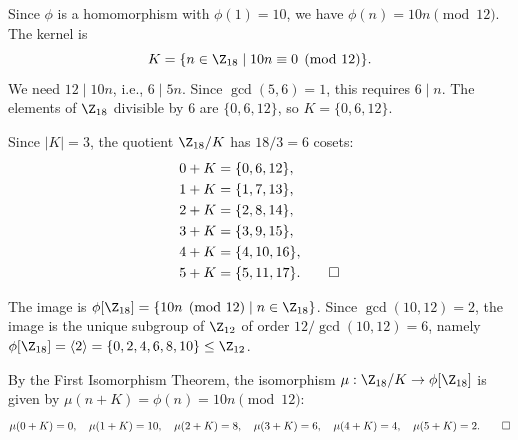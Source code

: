 \begin{solution}[(i)]
  Since $\phi$ is a homomorphism with $\phi(1) = 10$, we have $\phi(n) = 10n \pmod{12}$. The kernel is
  \[%
    K = \{n \in \Z_{18} \mid 10n \equiv 0 \pmod{12}\}.
  \]%
  We need $12 \mid 10n$, i.e., $6 \mid 5n$. Since $\gcd(5,6) = 1$, this requires $6 \mid n$. The elements of $\Z_{18}$ divisible by 6 are $\{0, 6, 12\}$, so $K = \{0, 6, 12\}$.
\end{solution}

\begin{solution}[(ii)]
  Since $|K| = 3$, the quotient $\Z_{18}/K$ has $18/3 = 6$ cosets:
  \begin{align*}
    0 + K &= \{0, 6, 12\}, \\
    1 + K &= \{1, 7, 13\}, \\
    2 + K &= \{2, 8, 14\}, \\
    3 + K &= \{3, 9, 15\}, \\
    4 + K &= \{4, 10, 16\}, \\
    5 + K &= \{5, 11, 17\}
  .\qedhere\end{align*}
\end{solution}

\begin{solution}[(iii)]
  The image is $\phi[\Z_{18}] = \{10n \pmod{12} \mid n \in \Z_{18}\}$. Since $\gcd(10, 12) = 2$, the image is the unique subgroup of $\Z_{12}$ of order $12/\gcd(10,12) = 6$, namely $\phi[\Z_{18}] = \langle 2 \rangle = \{0, 2, 4, 6, 8, 10\} \le \Z_{12}$.
\end{solution}

\begin{solution}[(iv)]
  By the First Isomorphism Theorem, the isomorphism $\mu : \Z_{18}/K \to \phi[\Z_{18}]$ is given by $\mu(n + K) = \phi(n) = 10n \pmod{12}$:
  \[%
    \mu(0 + K) = 0, \quad \mu(1 + K) = 10, \quad \mu(2 + K) = 8, \quad \mu(3 + K) = 6, \quad \mu(4 + K) = 4, \quad \mu(5 + K) = 2
  .\qedhere\]%
\end{solution}
